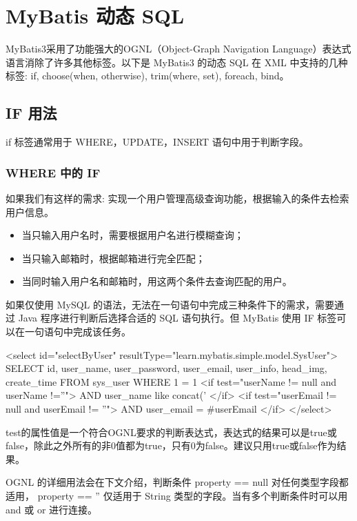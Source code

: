 \section{MyBatis 动态 SQL}

MyBatis3采用了功能强大的OGNL（Object-Graph Navigation Language）表达式语言消除了许多其他标签。以下是 MyBatis3 的动态 SQL 在 XML 中支持的几种标签: if, choose(when, otherwise), trim(where, set), foreach, bind。

\subsection{IF 用法}

if 标签通常用于 WHERE，UPDATE，INSERT 语句中用于判断字段。

\subsubsection*{WHERE 中的 IF}

如果我们有这样的需求: 实现一个用户管理高级查询功能，根据输入的条件去检索用户信息。
\begin{itemize}
    \item 当只输入用户名时，需要根据用户名进行模糊查询；
    \item 当只输入邮箱时，根据邮箱进行完全匹配；
    \item 当同时输入用户名和邮箱时，用这两个条件去查询匹配的用户。
\end{itemize}

如果仅使用 MySQL 的语法，无法在一句语句中完成三种条件下的需求，需要通过 Java 程序进行判断后选择合适的 SQL 语句执行。但 MyBatis 使用 IF 标签可以在一句语句中完成该任务。

\begin{xml}
<select id="selectByUser" resultType="learn.mybatis.simple.model.SysUser">
    SELECT id, user_name, user_password, user_email, user_info, head_img, create_time
    FROM sys_user
    WHERE 1 = 1
    <if test="userName != null and userName !=''">
        AND user_name like concat('%
    </if>
    <if test="userEmail != null and userEmail != ''">
        AND user_email = #{userEmail}
    </if>
</select>
\end{xml}

test的属性值是一个符合OGNL要求的判断表达式，表达式的结果可以是true或false，除此之外所有的非0值都为true，只有0为false。建议只用true或false作为结果。

OGNL 的详细用法会在下文介绍，判断条件 property == null 对任何类型字段都适用， property == '' 仅适用于 String 类型的字段。当有多个判断条件时可以用 and 或 or 进行连接。

